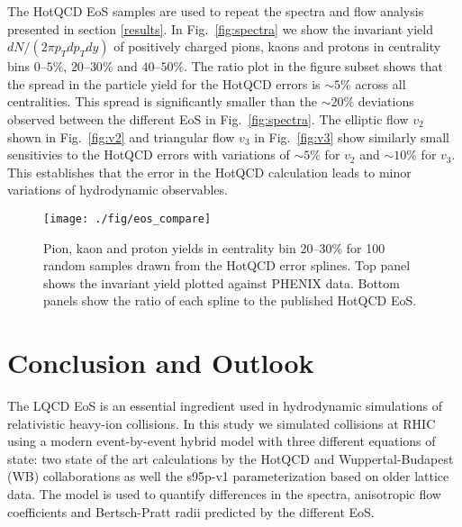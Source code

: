 \documentclass[aps,prc,reprint,amsmath,nofootinbib,superscriptaddress]{revtex4-1}
\begin{document}
The HotQCD EoS samples are used to repeat the spectra and flow analysis presented in section \ref{results}. In Fig.~\ref{fig:spectra} we show the invariant yield $dN/(2\pi p_T dp_T dy)$ of positively charged pions, kaons and protons
in centrality bins $0$--$5\%$, $20$--$30\%$ and $40$--$50\%$. The ratio plot in the figure subset shows that the spread in the particle yield for the HotQCD errors is ${\sim} 5\%$ across all centralities. 
This spread is significantly smaller than the ${\sim}20\%$ deviations observed between the different EoS in Fig.~\ref{fig:spectra}. The elliptic flow $v_2$ shown in Fig.~\ref{fig:v2} and triangular flow $v_3$ in Fig.~\ref{fig:v3}
show similarly small sensitivies to the HotQCD errors with variations of ${\sim}5\%$ for $v_2$ and ${\sim}10\%$ for $v_3$. This establishes that the error in the HotQCD calculation leads to minor variations of hydrodynamic
observables.

\begin{figure}[t]
  \texttt{[image: ./fig/eos\_compare]}
  \caption{
    \label{fig:splines}
    Pion, kaon and proton yields in centrality bin 20--30\% for 100 random samples drawn from the HotQCD error splines. Top panel shows the invariant yield plotted against PHENIX data. Bottom panels show the ratio of each spline
    to the published HotQCD EoS.
  }
\end{figure}

\section{Conclusion and Outlook}
\label{conclusion}

The LQCD EoS is an essential ingredient used in hydrodynamic simulations of relativistic heavy-ion collisions. In this study we simulated collisions at RHIC using a modern event-by-event hybrid model with three different equations of state: 
two state of the art calculations by the HotQCD and Wuppertal-Budapest (WB) collaborations as well the s95p-v1 parameterization based on older lattice data. The model is used to quantify differences in the spectra, anisotropic flow coefficients and 
Bertsch-Pratt radii predicted by the different EoS. 
\end{document}
